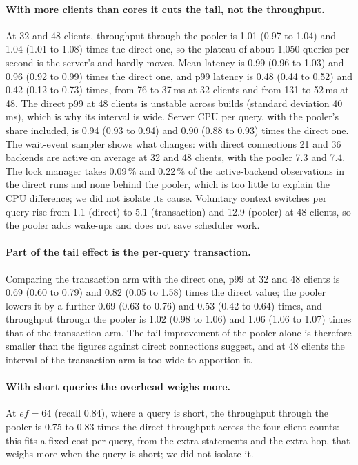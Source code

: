 \documentclass[sigconf, nonacm]{acmart}
\begin{document}
\paragraph{With more clients than cores it cuts the tail, not the throughput.} At 32 and 48 clients, throughput through the pooler is
1.01 (0.97 to 1.04) and 1.04 (1.01 to 1.08) times the direct one, so the plateau of about 1{,}050 queries per second is the server's and
hardly moves. Mean latency is 0.99 (0.96 to 1.03) and 0.96 (0.92 to 0.99) times the direct one, and p99 latency is 0.48 (0.44 to 0.52) and 0.42 (0.12 to 0.73)
times, from 76 to 37\,ms at 32 clients and from 131 to 52\,ms at 48. The direct p99
at 48 clients is unstable across builds (standard deviation 40\,ms), which is why its interval is wide. Server CPU per query,
with the pooler's share included, is 0.94 (0.93 to 0.94) and 0.90 (0.88 to 0.93) times the direct one. The wait-event sampler shows what changes:
with direct connections 21 and 36 backends are active on average at 32 and 48 clients, with the
pooler 7.3 and 7.4. The lock manager takes 0.09\,\% and 0.22\,\% of the active-backend observations in the direct
runs and none behind the pooler, which is too little to explain the CPU difference; we did not isolate its cause. Voluntary context
switches per query rise from 1.1 (direct) to 5.1 (transaction) and 12.9 (pooler) at 48 clients, so the pooler adds wake-ups
and does not save scheduler work.

\paragraph{Part of the tail effect is the per-query transaction.} Comparing the transaction arm with the direct one, p99 at 32 and
48 clients is 0.69 (0.60 to 0.79) and 0.82 (0.05 to 1.58) times the direct value; the pooler lowers it by a further 0.69 (0.63 to 0.76) and 0.53 (0.42 to 0.64)
times, and throughput through the pooler is 1.02 (0.98 to 1.06) and 1.06 (1.06 to 1.07) times that of the transaction arm. The tail
improvement of the pooler alone is therefore smaller than the figures against direct connections suggest, and at 48 clients the
interval of the transaction arm is too wide to apportion it.

\paragraph{With short queries the overhead weighs more.} At $ef=64$ (recall 0.84), where a query is short, the throughput
through the pooler is 0.75 to 0.83 times the direct throughput across the four client counts: this
fits a fixed cost per query, from the extra statements and the extra hop, that weighs more when the query is short; we did not isolate it.
\end{document}
